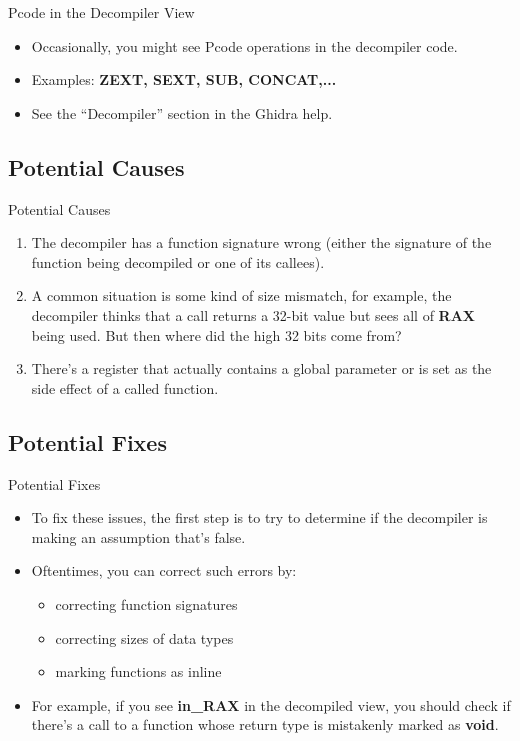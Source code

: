 \documentclass{beamer}
\begin{document}
\begin{frame}
\begin{block}{Pcode in the Decompiler View}
\begin{itemize}
\item Occasionally, you might see Pcode operations in the decompiler code. 
\item Examples: \textbf{ZEXT, SEXT, SUB, CONCAT,...}
\item See the ``Decompiler'' section in the Ghidra help. 
\end{itemize}
\end{block}
\end{frame}

\subsection{Potential Causes}
\begin{frame}
\begin{block}{Potential Causes}
\begin{enumerate}
\item The decompiler has a function signature wrong (either the signature of the function being decompiled or one of its callees). 
\item A common situation is some kind of size mismatch, for example, the decompiler thinks that a call returns a 32-bit value but sees all of \textbf{RAX} being used.  
But then where did the high 32 bits come from?
\item There's a register that actually contains a global parameter or is set as the side effect of a called function.
\end{enumerate}
\end{block}
\end{frame}

\subsection{Potential Fixes}
\begin{frame}
\begin{block}{Potential Fixes}
\begin{itemize}
\item To fix these issues, the first step is to try to determine if the decompiler is making an assumption that's false.
\item Oftentimes, you can correct such errors by:
\begin{itemize}
\item correcting function signatures
\item correcting sizes of data types
\item marking functions as inline
\end{itemize}
\item For example, if you see \textbf{in\_RAX} in the decompiled view, you should check if there's a call to a function whose return type is mistakenly marked as \textbf{void}.
\end{itemize}
\end{block}
\end{frame}
\end{document}
